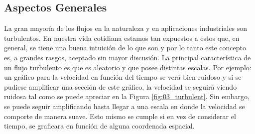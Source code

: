 \subsection{Aspectos Generales}
La gran mayoría de los flujos en la naturaleza y en aplicaciones industriales son turbulentos. En nuestra vida cotidiana estamos tan expuestos a estos que, en general, se tiene una buena intuición de lo que son y por lo tanto este concepto es, a grandes rasgos, aceptado sin mayor discusión. La principal característica de un flujo turbulento es que es aleatorio y que posee distintas escalas. Por ejemplo: un gráfico para la velocidad en función del tiempo se verá bien ruidoso y si se pudiese amplificar una sección de este gráfico, la velocidad se seguirá viendo ruidosa tal como se puede apreciar en la Figura \ref{fig:03_turbulent}. Sin embargo, se puede seguir amplificando hasta llegar a una escala en donde la velocidad se comporte de manera suave. Esto mismo se cumple si en vez de considerar el tiempo, se graficara en función de alguna coordenada espacial.

